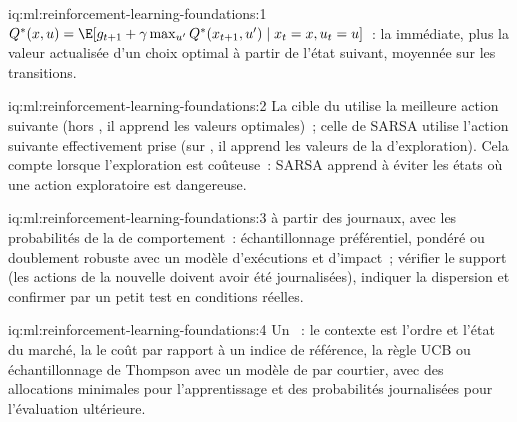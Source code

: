 \begin{solution}{iq:ml:reinforcement-learning-foundations:1}
$Q^*(x, u) = \E[g_{t+1} + \gamma\max_{u'}Q^*(x_{t+1}, u')\mid x_t = x, u_t = u]$~: la  immédiate, plus la valeur actualisée
d'un choix optimal à partir de l'état suivant, moyennée sur les transitions.
\end{solution}

\begin{solution}{iq:ml:reinforcement-learning-foundations:2}
La cible du  utilise la meilleure action suivante (hors , il apprend les valeurs optimales)~; celle de SARSA utilise l'action suivante effectivement prise
(sur , il apprend les valeurs de la  d'exploration). Cela compte lorsque l'exploration est coûteuse~: SARSA apprend à éviter les états où
une action exploratoire est dangereuse.
\end{solution}

\begin{solution}{iq:ml:reinforcement-learning-foundations:3}
 à partir des journaux, avec les probabilités de la  de comportement~: échantillonnage préférentiel, pondéré ou doublement robuste avec
un modèle d'exécutions et d'impact~; vérifier le support (les actions de la nouvelle  doivent avoir été journalisées), indiquer la dispersion et confirmer
par un petit test en conditions réelles.
\end{solution}

\begin{solution}{iq:ml:reinforcement-learning-foundations:4}
Un ~: le contexte est l'ordre et l'état du marché, la  le coût par rapport à un indice de référence, la règle UCB ou
échantillonnage de Thompson avec un modèle de  par courtier, avec des allocations minimales pour l'apprentissage et des probabilités journalisées pour
l'évaluation ultérieure.
\end{solution}

